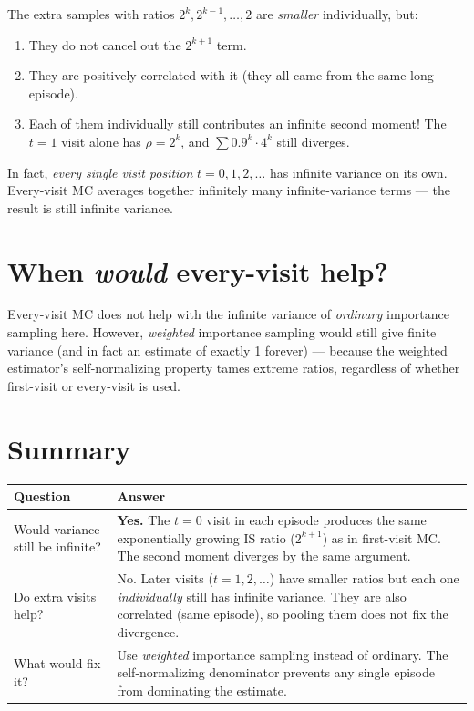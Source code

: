 \documentclass[11pt]{article}
\begin{document}
The extra samples with ratios $2^k, 2^{k-1}, \ldots, 2$ are \textit{smaller} individually, but:
\begin{enumerate}[nosep]
    \item They do not cancel out the $2^{k+1}$ term.
    \item They are positively correlated with it (they all came from the same long episode).
    \item Each of them individually still contributes an infinite second moment! The $t = 1$ visit alone has $\rho = 2^k$, and $\sum 0.9^k \cdot 4^k$ still diverges.
\end{enumerate}

In fact, \textit{every single visit position} $t = 0, 1, 2, \ldots$ has infinite variance on its own. Every-visit MC averages together infinitely many infinite-variance terms --- the result is still infinite variance.

\section*{When \textit{would} every-visit help?}

Every-visit MC does not help with the infinite variance of \textit{ordinary} importance sampling here. However, \textit{weighted} importance sampling would still give finite variance (and in fact an estimate of exactly 1 forever) --- because the weighted estimator's self-normalizing property tames extreme ratios, regardless of whether first-visit or every-visit is used.

\section*{Summary}

\begin{table}[ht]
    \centering
    \begin{tabular}{p{} p{}}
        \toprule
        \textbf{Question} & \textbf{Answer} \\
        \midrule
        Would variance still be infinite? & \textbf{Yes.} The $t=0$ visit in each episode produces the same exponentially growing IS ratio ($2^{k+1}$) as in first-visit MC. The second moment diverges by the same argument. \\
        \addlinespace
        Do extra visits help? & No. Later visits ($t = 1, 2, \ldots$) have smaller ratios but each one \textit{individually} still has infinite variance. They are also correlated (same episode), so pooling them does not fix the divergence. \\
        \addlinespace
        What would fix it? & Use \textit{weighted} importance sampling instead of ordinary. The self-normalizing denominator prevents any single episode from dominating the estimate. \\
        \bottomrule
    \end{tabular}
\end{table}
\end{document}
